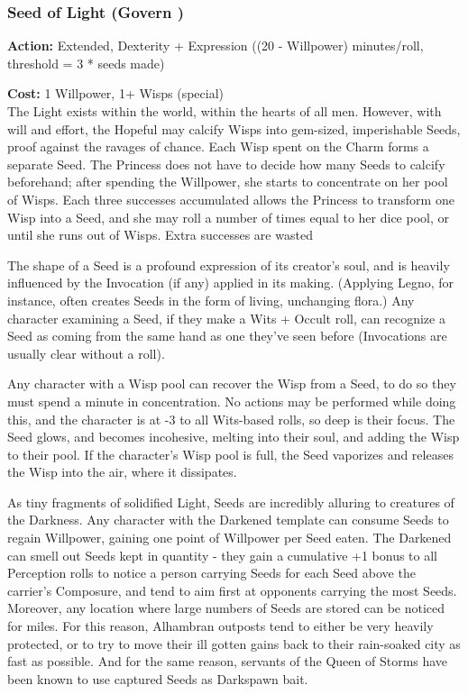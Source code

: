 \subsubsection*{Seed of Light (Govern \textbullet\textbullet)}

\noindent \textbf{Action:} Extended, Dexterity + Expression ((20 - Willpower) minutes/roll, threshold = 3 * seeds made)

\noindent \textbf{Cost:} 1 Willpower, 1+ Wisps (special)\\

\noindent The Light exists within the world, within the hearts of all men. However, with will and effort, the Hopeful may calcify Wisps into gem-sized, imperishable Seeds, proof against the ravages of chance. Each Wisp spent on the Charm forms a separate Seed. The Princess does not have to decide how many Seeds to calcify beforehand; after spending the Willpower, she starts to concentrate on her pool of Wisps. Each three successes accumulated allows the Princess to transform one Wisp into a Seed, and she may roll a number of times equal to her dice pool, or until she runs out of Wisps. Extra successes are wasted

The shape of a Seed is a profound expression of its creator's soul, and is heavily influenced by the Invocation (if any) applied in its making. (Applying Legno, for instance, often creates Seeds in the form of living, unchanging flora.) Any character examining a Seed, if they make a Wits + Occult roll, can recognize a Seed as coming from the same hand as one they've seen before (Invocations are usually clear without a roll). 

Any character with a Wisp pool can recover the Wisp from a Seed, to do so they must spend a minute in concentration. No actions may be performed while doing this, and the character is at -3 to all Wits-based rolls, so deep is their focus. The Seed glows, and becomes incohesive, melting into their soul, and adding the Wisp to their pool. If the character's Wisp pool is full, the Seed vaporizes and releases the Wisp into the air, where it dissipates.

As tiny fragments of solidified Light, Seeds are incredibly alluring to creatures of the Darkness. Any character with the Darkened template can consume Seeds to regain Willpower, gaining one point of Willpower per Seed eaten. The Darkened can smell out Seeds kept in quantity - they gain a cumulative +1 bonus to all Perception rolls to notice a person carrying Seeds for each Seed above the carrier's Composure, and tend to aim first at opponents carrying the most Seeds. Moreover, any location where large numbers of Seeds are stored can be noticed for miles. For this reason, Alhambran outposts tend to either be very heavily protected, or to try to move their ill gotten gains back to their rain-soaked city as fast as possible. And for the same reason, servants of the Queen of Storms have been known to use captured Seeds as Darkspawn bait.

